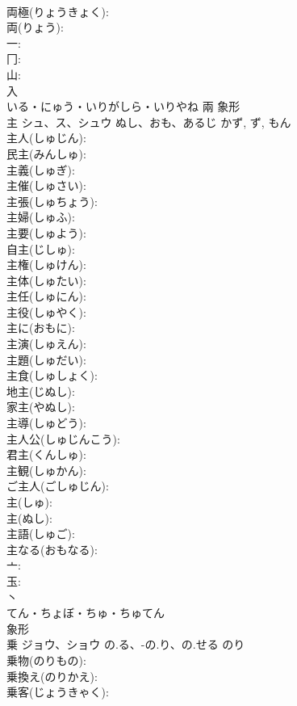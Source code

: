 \documentclass[8pt]{extreport}
\begin{document}
\begin{CJK}{UTF8}{min}
\\	両極(りょうきょく): 
\\	両(りょう): 
\\	一: 
\\	冂: 
\\	山: 
\\	入	
\\	いる・にゅう・いりがしら・いりやね	兩	象形 
\\	主	シュ、ス、シュウ	ぬし、おも、あるじ	かず, ず, もん	
\\	主人(しゅじん): 
\\	民主(みんしゅ): 
\\	主義(しゅぎ): 
\\	主催(しゅさい): 
\\	主張(しゅちょう): 
\\	主婦(しゅふ): 
\\	主要(しゅよう): 
\\	自主(じしゅ): 
\\	主権(しゅけん): 
\\	主体(しゅたい): 
\\	主任(しゅにん): 
\\	主役(しゅやく): 
\\	主に(おもに): 
\\	主演(しゅえん): 
\\	主題(しゅだい): 
\\	主食(しゅしょく): 
\\	地主(じぬし): 
\\	家主(やぬし): 
\\	主導(しゅどう): 
\\	主人公(しゅじんこう): 
\\	君主(くんしゅ): 
\\	主観(しゅかん): 
\\	ご主人(ごしゅじん): 
\\	主(しゅ): 
\\	主(ぬし): 
\\	主語(しゅご): 
\\	主なる(おもなる): 
\\	亠: 
\\	玉: 
\\	丶	
\\	てん・ちょぼ・ちゅ・ちゅてん	
\\	象形 
\\	乗	ジョウ、ショウ	の.る、-の.り、の.せる	のり	
\\	乗物(のりもの): 
\\	乗換え(のりかえ): 
\\	乗客(じょうきゃく): 

\end{CJK}
\end{document}
